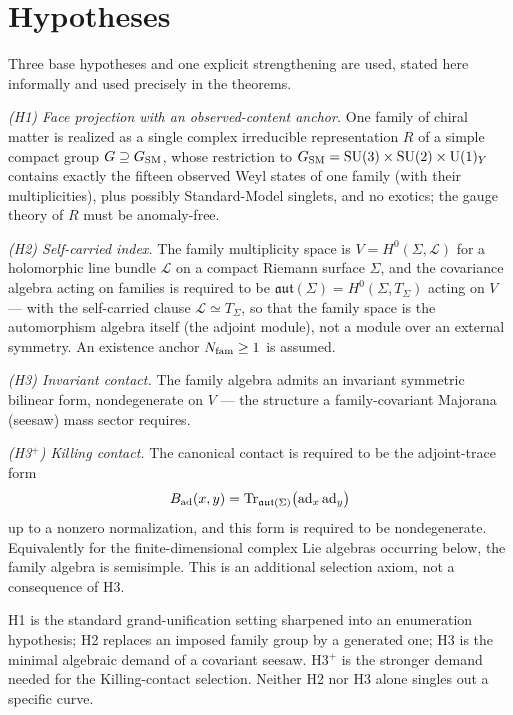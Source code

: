 \documentclass[
  aps,prd,superscriptaddress,nofootinbib,preprint
]{revtex4-2}
\theoremstyle{remark}
\newcommand{\SU}{\mathrm{SU}}
\newcommand{\U}{\mathrm{U}}
\newcommand{\Tr}{\mathrm{Tr}}
\newcommand{\aut}{\mathfrak{aut}}
\begin{document}
\section{Hypotheses}
\label{sec:hypotheses}

Three base hypotheses and one explicit strengthening are used, stated here
informally and used precisely in the theorems.

\emph{(H1) Face projection with an observed-content anchor.}  One
family of chiral matter is realized as a single complex irreducible
representation $R$ of a simple compact group $G\supseteq G_{\rm SM}$,
whose restriction to $G_{\rm SM}=\SU(3)\times\SU(2)\times\U(1)_Y$
contains exactly the fifteen observed Weyl states of one family
(with their multiplicities), plus possibly Standard-Model singlets,
and no exotics; the gauge theory of $R$ must be anomaly-free.

\emph{(H2) Self-carried index.}  The family multiplicity space is
$V=H^0(\Sigma,\mathcal L)$ for a holomorphic line bundle
$\mathcal L$ on a compact Riemann surface $\Sigma$, and the covariance
algebra acting on families is required to be
$\aut(\Sigma)=H^0(\Sigma,T_\Sigma)$ acting on $V$ --- with the
self-carried clause $\mathcal L\simeq T_\Sigma$, so that the family
space is the automorphism algebra itself (the adjoint module), not a
module over an external symmetry.  An existence anchor $N_{\rm fam}\ge1$
is assumed.

\emph{(H3) Invariant contact.}  The family algebra admits an invariant
symmetric bilinear form, nondegenerate on $V$ --- the
structure a family-covariant Majorana (seesaw) mass sector requires.

\emph{(H3$^+$) Killing contact.}  The canonical contact is required to
be the adjoint-trace form
\[
 B_{\rm ad}(x,y)=\Tr_{\aut(\Sigma)}
   \bigl(\operatorname{ad}_x\operatorname{ad}_y\bigr)
\]
up to a nonzero normalization, and this form is required to be
nondegenerate.  Equivalently for the finite-dimensional complex Lie
algebras occurring below, the family algebra is semisimple.  This is an
additional selection axiom, not a consequence of H3.

H1 is the standard grand-unification setting
\cite{Georgi1975,FritzschMinkowski1975} sharpened into an enumeration
hypothesis; H2 replaces an imposed family group by a generated one;
H3 is the minimal algebraic demand of a covariant seesaw.  H3$^+$ is the
stronger demand needed for the Killing-contact selection.  Neither H2
nor H3 alone singles out a specific curve.
\end{document}
